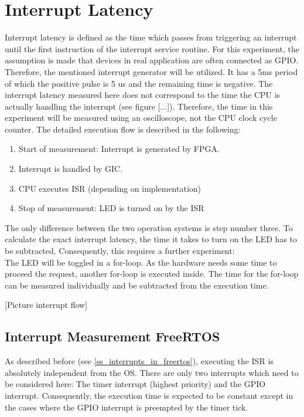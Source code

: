 \section{Interrupt Latency}
Interrupt latency is defined as the time which passes from triggering an interrupt until the first instruction of the interrupt service routine. 
For this  experiment, the assumption is made that devices in real application are often connected as \ac{GPIO}.
Therefore, the mentioned interrupt generator will be utilized.
It has a 5ms period of which the positive pulse is 5 us and the remaining time is negative.
The interrupt latency measured here does not correspond to the time the \ac{CPU} is actually handling the interrupt (see figure [...]).
Therefore, the time in this experiment will be measured using an oscilloscope, not the \ac{CPU} clock cycle counter.
The detailed execution flow is described in the following:
\begin{enumerate}
	\item Start of measurement: Interrupt is generated by \ac{FPGA}.
	\item Interrupt is handled by \ac{GIC}.
	\item \ac{CPU} executes \ac{ISR} (depending on implementation)
	\item Stop of measurement: \ac{LED} is turned on by the \ac{ISR}
\end{enumerate}
The only difference between the two operation systems is step number three. 
To calculate the exact interrupt latency, the time it takes to turn on the \ac{LED} has to be subtracted.
Consequently, this requires a further experiment:\\
The \ac{LED} will be toggled in a for-loop.
As the hardware needs some time to proceed the request, another for-loop is executed inside.
The time for the for-loop can be measured individually and be subtracted from the execution time.

[Picture interrupt flow]

\subsection{Interrupt Measurement FreeRTOS}
As described before (see \ref{ss_interrupts_in_freertos}), executing the \ac{ISR} is absolutely independent from the \ac{OS}.
There are only two interrupts which need to be considered here: The timer interrupt (highest priority) and the \ac{GPIO} interrupt.
Consequently, the execution time is expected to be constant except in the cases where the \ac{GPIO} interrupt is preempted by the timer tick.

